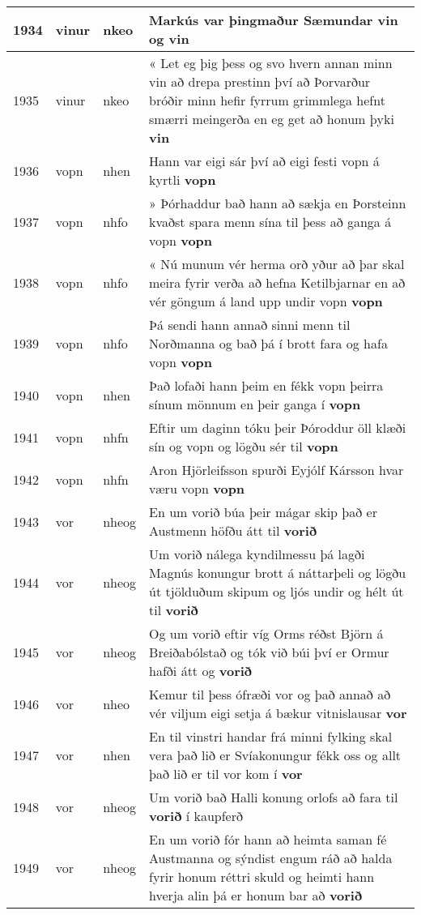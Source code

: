 \documentclass{article}
\begin{document}
\begin{longtable}{p{1cm}|p{1cm}|p{1cm}|p{13cm}}
\hline
1934&vinur&nkeo&Markús var þingmaður Sæmundar \textbf{vin} og vin\\
\hline
1935&vinur&nkeo&« Let eg þig þess og svo hvern annan minn vin að drepa prestinn því að Þorvarður bróðir minn hefir fyrrum grimmlega hefnt smærri meingerða en eg get að honum þyki \textbf{vin} \\
\hline
1936&vopn&nhen&Hann var eigi sár því að eigi festi vopn á kyrtli \textbf{vopn} \\
\hline
1937&vopn&nhfo&» Þórhaddur bað hann að sækja en Þorsteinn kvaðst spara menn sína til þess að ganga á vopn \textbf{vopn} \\
\hline
1938&vopn&nhfo&« Nú munum vér herma orð yður að þar skal meira fyrir verða að hefna Ketilbjarnar en að vér göngum á land upp undir vopn \textbf{vopn} \\
\hline
1939&vopn&nhfo&Þá sendi hann annað sinni menn til Norðmanna og bað þá í brott fara og hafa vopn \textbf{vopn} \\
\hline
1940&vopn&nhen&Það lofaði hann þeim en fékk vopn þeirra sínum mönnum en þeir ganga í \textbf{vopn} \\
\hline
1941&vopn&nhfn&Eftir um daginn tóku þeir Þóroddur öll klæði sín og vopn og lögðu sér til \textbf{vopn} \\
\hline
1942&vopn&nhfn&Aron Hjörleifsson spurði Eyjólf Kársson hvar væru vopn \textbf{vopn} \\
\hline
1943&vor&nheog&En um vorið búa þeir mágar skip það er Austmenn höfðu átt til \textbf{vorið} \\
\hline
1944&vor&nheog&Um vorið nálega kyndilmessu þá lagði Magnús konungur brott á náttarþeli og lögðu út tjölduðum skipum og ljós undir og hélt út til \textbf{vorið} \\
\hline
1945&vor&nheog&Og um vorið eftir víg Orms réðst Björn á Breiðabólstað og tók við búi því er Ormur hafði átt og \textbf{vorið} \\
\hline
1946&vor&nheo&Kemur til þess ófræði vor og það annað að vér viljum eigi setja á bækur vitnislausar \textbf{vor} \\
\hline
1947&vor&nhen&En til vinstri handar frá minni fylking skal vera það lið er Svíakonungur fékk oss og allt það lið er til vor kom í \textbf{vor} \\
\hline
1948&vor&nheog&Um vorið bað Halli konung orlofs að fara til \textbf{vorið} í kaupferð\\
\hline
1949&vor&nheog&En um vorið fór hann að heimta saman fé Austmanna og sýndist engum ráð að halda fyrir honum réttri skuld og heimti hann hverja alin þá er honum bar að \textbf{vorið} \\

\end{longtable}
\end{document}
